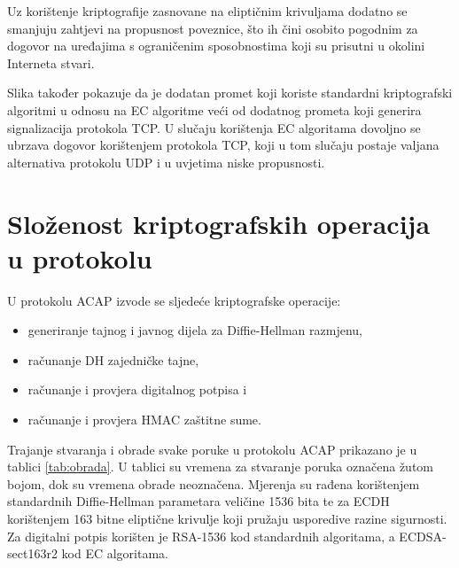 Uz korištenje kriptografije zasnovane na eliptičnim krivuljama dodatno se
smanjuju zahtjevi na propusnost poveznice, što ih čini osobito pogodnim za
dogovor na uređajima s ograničenim sposobnostima koji su prisutni u okolini
Interneta stvari.

Slika također pokazuje da je dodatan promet koji koriste standardni
kriptografski algoritmi u odnosu na EC algoritme veći od dodatnog prometa koji
generira signalizacija protokola TCP. U slučaju korištenja EC algoritama
dovoljno se ubrzava dogovor korištenjem protokola TCP, koji u tom slučaju postaje
valjana alternativa protokolu UDP i u uvjetima niske propusnosti.

\section{Složenost kriptografskih operacija u protokolu}
\label{sec:complex}

U protokolu ACAP izvode se sljedeće kriptografske operacije:
\begin{itemize}
    \item generiranje tajnog i javnog dijela za Diffie-Hellman razmjenu,
    \item računanje DH zajedničke tajne,
    \item računanje i provjera digitalnog potpisa i
    \item računanje i provjera HMAC zaštitne sume.
\end{itemize}

Trajanje stvaranja i obrade svake poruke u protokolu ACAP prikazano je u
tablici \ref{tab:obrada}. U tablici su vremena za stvaranje poruka označena
žutom bojom, dok su vremena obrade neoznačena. Mjerenja su rađena korištenjem standardnih
Diffie-Hellman parametara veličine 1536 bita te za ECDH korištenjem 163 bitne
eliptične krivulje koji pružaju usporedive razine sigurnosti. Za digitalni
potpis korišten je RSA-1536 kod standardnih algoritama, a ECDSA-sect163r2 kod EC
algoritama.

